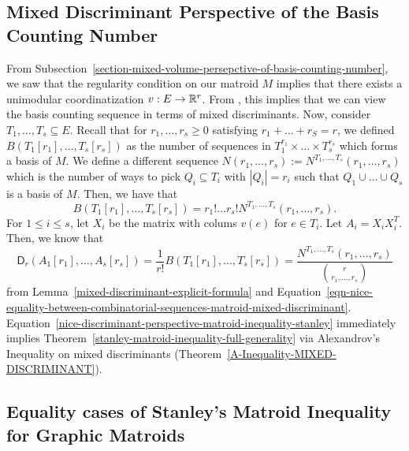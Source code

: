 \documentclass{puthesis-UG}
\begin{document}
\subsection{Mixed Discriminant Perspective of the Basis Counting Number}

From Subsection~\ref{section-mixed-volume-persepctive-of-basis-counting-number}, we saw that the regularity condition on our matroid $M$ implies that there exists a unimodular coordinatization $v : E \to \mathbb{R}^r$. From \cite{bapat_raghavan_1997}, this implies that we can view the basis counting sequence in terms of mixed discriminants. Now, consider $T_1, \ldots, T_s \subseteq E$. Recall that for $r_1, \ldots, r_s \geq 0$ satisfying $r_1 + \ldots + r_S = r$, we defined $B(T_1[r_1], \ldots, T_s[r_s])$ as the number of sequences in $T_1^{r_1} \times \ldots \times T_s^{r_s}$ which forms a basis of $M$. We define a different sequence $N(r_1, \ldots, r_s) := N^{T_1, \ldots, T_s}(r_1, \ldots, r_s)$ which is the number of ways to pick $Q_i \subseteq T_i$ with $|Q_i| = r_i$ such that $Q_1 \cup \ldots \cup Q_s$ is a basis of $M$. Then, we have that
\begin{equation} \label{eqn-nice-equality-between-combinatorial-sequences-matroid-mixed-discriminant}
	B(T_1[r_1], \ldots, T_s[r_s]) = r_1! \ldots r_s! N^{T_1, \ldots, T_s}(r_1, \ldots, r_s).
\end{equation}
For $1 \leq i \leq s$, let $X_i$ be the matrix with colums $v(e)$ for $e \in T_i$. Let $A_i = X_i X_i^T$. Then, we know that 
\begin{equation} \label{nice-discriminant-perspective-matroid-inequality-stanley}
	\mathsf{D}_r (A_1[r_1], \ldots, A_s[r_s]) = \frac{1}{r!} B(T_1[r_1], \ldots, T_s[r_s]) = \frac{N^{T_1, \ldots, T_s}(r_1, \ldots, r_s)}{\binom{r}{r_1, \ldots, r_s}}
\end{equation}
from Lemma~\ref{mixed-discriminant-explicit-formula} and Equation~\ref{eqn-nice-equality-between-combinatorial-sequences-matroid-mixed-discriminant}. Equation~\ref{nice-discriminant-perspective-matroid-inequality-stanley} immediately implies Theorem~\ref{stanley-matroid-inequality-full-generality} via Alexandrov's Inequality on mixed discriminants (Theorem~\ref{A-Inequality-MIXED-DISCRIMINANT}). 


\subsection{Equality cases of Stanley's Matroid Inequality for Graphic Matroids}
\end{document}
